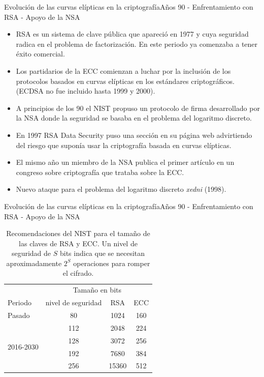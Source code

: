\documentclass[spanish]{beamer}
\begin{document}
\begin{frame}[fragile]{Evolución de las curvas elípticas en la criptografía}{Años 90 - Enfrentamiento con RSA - Apoyo de la NSA}
  \begin{itemize}
    \item RSA es un sistema de clave pública que apareció en 1977 y cuya seguridad radica en el problema de factorización. En este periodo ya comenzaba a tener éxito comercial. %
    \item Los partidarios de la ECC comienzan a luchar por la inclusión de los protocolos basados en curvas elípticas en los estándares criptográficos. (ECDSA no fue incluido hasta 1999 y 2000).
    \item A principios de los 90 el NIST propuso un protocolo de firma desarrollado por la NSA donde la seguridad se basaba en el problema del logaritmo discreto.%
    \item En 1997 RSA Data Security puso una sección en su página web advirtiendo del riesgo que suponía usar la criptografía basada en curvas elípticas. %
    \item El mismo año  un miembro de la NSA publica
    el primer artículo en un congreso sobre criptografía que trataba sobre la ECC.
    \item Nuevo ataque para el problema del logaritmo discreto \textit{xedni} (1998). %
  \end{itemize}
\end{frame}

\begin{frame}[fragile]{Evolución de las curvas elípticas en la criptografía}{Años 90 - Enfrentamiento con RSA - Apoyo de la NSA}
\begin{table}[h]
  \centering
  \sffamily
  \begin{tabular}{lccc}
    \toprule
     & \multicolumn{3}{c}{Tamaño en bits} \\
    Periodo & nivel de seguridad & RSA & ECC \\
    \midrule
    Pasado & 80 & 1024 & 160\\
    \multirow[t]{4}{*}{2016-2030} & 112 & 2048 & 224\\
     & 128 & 3072 & 256\\
     & 192 & 7680 & 384\\
     & 256 & 15360 & 512\\
    \bottomrule
  \end{tabular}
  \caption{Recomendaciones del NIST para el tamaño de las claves de RSA y ECC. Un nivel de seguridad de \(S\) bits indica que se necesitan aproximadamente \(2^S\) operaciones para romper el cifrado.}
  \label{tab:rsa-ecc-nist}
\end{table} %
\end{frame}
\end{document}
